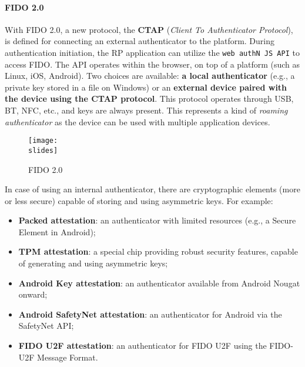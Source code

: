 \paragraph{FIDO 2.0}

With FIDO 2.0, a new protocol, the \textbf{CTAP} (\textit{Client To Authenticator Protocol}), is defined for connecting an external authenticator to the platform. During authentication initiation, the RP application can utilize the \texttt{web authN JS API} to access FIDO. The API operates within the browser, on top of a platform (such as Linux, iOS, Android). Two choices are available: \textbf{a local authenticator} (e.g., a private key stored in a file on Windows) or an \textbf{external device paired with the device using the CTAP protocol}. This protocol operates through USB, BT, NFC, etc., and keys are always present. This represents a kind of \textit{roaming authenticator} as the device can be used with multiple application devices.


\begin{figure}[h]
  \centering
  \texttt{[image: \\slides]}
  \caption*{FIDO 2.0}
\end{figure}

In case of using an internal authenticator, there are cryptographic elements (more or less secure) capable of storing and using asymmetric keys.
For example:
\begin{itemize}
  \item \textbf{Packed attestation}: an authenticator with limited resources (e.g., a Secure Element in Android);
  \item \textbf{TPM attestation}: a special chip providing robust security features, capable of generating and using asymmetric keys;
  \item \textbf{Android Key attestation}: an authenticator available from Android Nougat onward;
  \item \textbf{Android SafetyNet attestation}: an authenticator for Android via the SafetyNet API;
  \item \textbf{FIDO U2F attestation}: an authenticator for FIDO U2F using the FIDO-U2F Message Format.
\end{itemize}

